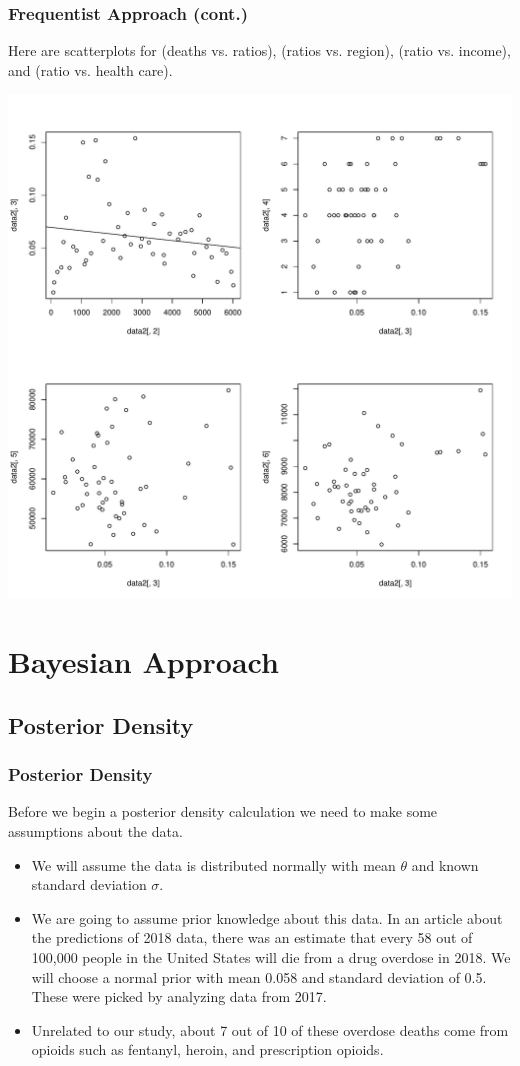 \documentclass[10pt]{beamer}
\begin{document}
\begin{frame}
\frametitle{Frequentist Approach (cont.)}
	Here are scatterplots for (deaths vs. ratios), (ratios vs. region), (ratio vs. income), and (ratio vs. health care).
	\begin{center}
	\includegraphics[scale=0.25]{linreg1.pdf} 
	\end{center}
\end{frame}

\section{Bayesian Approach}
\subsection{Posterior Density}
\begin{frame}
\frametitle{Posterior Density}
Before we begin a posterior density calculation we need to make some assumptions about the data.
	\begin{itemize}
		\item We will assume the data is distributed normally with mean $\theta$ and known standard deviation $\sigma$.
		\item We are going to assume prior knowledge about this data. In an article about the predictions of 2018 data, there was an estimate that every 58 out of 100,000 people in the United States will die from a drug overdose in 2018\cite{article}. We will choose a normal prior with mean 0.058 and standard deviation of 0.5. These were picked by analyzing data from 2017.
		\item Unrelated to our study, about 7 out of 10 of these overdose deaths come from opioids such as fentanyl, heroin, and prescription opioids\cite{article}.
	\end{itemize}
\end{frame}
\end{document}
